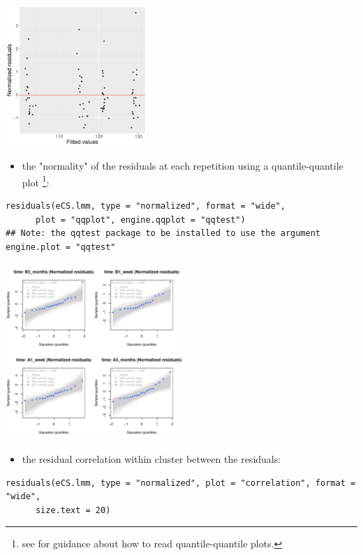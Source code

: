 \documentclass[12pt]{article}
\begin{document}
\begin{center}
\includegraphics[width=0.4\textwidth]{./figures/diag-scatterplot.pdf}
\end{center}

\clearpage

\begin{itemize}
\item the "normality" of the residuals at each repetition using a
quantile-quantile plot \footnote{see \cite{oldford2016self} for guidance
about how to read quantile-quantile plots.}:
\end{itemize}
\lstset{language=r,label= ,caption= ,captionpos=b,numbers=none}
\begin{lstlisting}
residuals(eCS.lmm, type = "normalized", format = "wide",
	  plot = "qqplot", engine.qqplot = "qqtest")
## Note: the qqtest package to be installed to use the argument engine.plot = "qqtest" 
\end{lstlisting}

\begin{center}
\includegraphics[width=0.5\textwidth]{./figures/diag-qqplot.pdf}
\end{center}

\begin{itemize}
\item the residual correlation within cluster between the residuals:
\end{itemize}
\lstset{language=r,label= ,caption= ,captionpos=b,numbers=none}
\begin{lstlisting}
residuals(eCS.lmm, type = "normalized", plot = "correlation", format = "wide",
	  size.text = 20)
\end{lstlisting}
\end{document}
